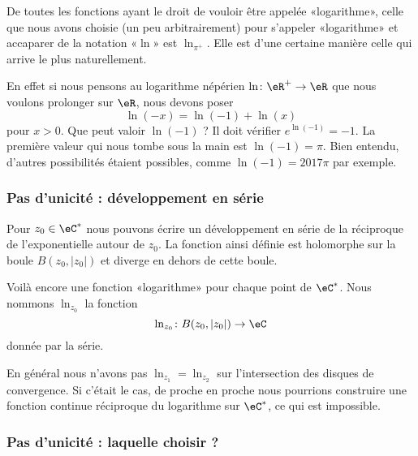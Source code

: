 De toutes les fonctions ayant le droit de vouloir être appelée «logarithme», celle que nous avons choisie (un peu arbitrairement) pour s'appeler «logarithme» et accaparer de la notation «\( \ln\)» est \( \ln_{\pi^+}\). Elle est d'une certaine manière celle qui arrive le plus naturellement.

En effet si nous pensons au logarithme népérien \( \ln\colon \eR^+\to \eR\) que nous voulons prolonger sur \( \eR\), nous devons poser
\begin{equation}
    \ln(-x)=\ln(-1)+\ln(x)
\end{equation}
pour \( x>0\). Que peut valoir \( \ln(-1)\) ? Il doit vérifier \(  e^{\ln(-1)}=-1\). La première valeur qui nous tombe sous la main est \( \ln(-1)=\pi\). Bien entendu, d'autres possibilités étaient possibles, comme \( \ln(-1)=2017\pi\) par exemple.

\subsubsection{Pas d'unicité : développement en série}

Pour \( z_0\in \eC^*\) nous pouvons écrire un développement en série de la réciproque de l'exponentielle autour de \( z_0\). La fonction ainsi définie est holomorphe sur la boule \( B(z_0,| z_0 |)\) et diverge en dehors de cette boule.

Voilà encore une fonction «logarithme» pour chaque point de \( \eC^*\). Nous nommons \( \ln_{z_0}\) la fonction
\begin{equation}
    \ln_{z_0}\colon B(z_0,| z_0 |)\to \eC
\end{equation}
donnée par la série.

En général nous n'avons pas \( \ln_{z_1}=\ln_{z_2}\) sur l'intersection des disques de convergence. Si c'était le cas, de proche en proche nous pourrions construire une fonction continue réciproque du logarithme sur \( \eC^*\), ce qui est impossible.

\subsubsection{Pas d'unicité : laquelle choisir ?}

